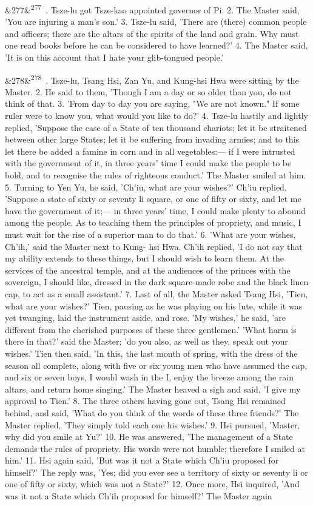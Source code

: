 \documentclass[12pt]{article}
\newcommand{\para}[1][]{\par\noindent\ifx&#1&\else\textsuperscript{\footnotesize #1}~\fi}
\begin{document}
\para[277] 1. Tsze-lu got Tsze-kao appointed governor of Pi. 2. The Master said, 'You are injuring a man's son.' 3. Tsze-lu said, 'There are (there) common people and officers; there are the altars of the spirits of the land and grain. Why must one read books before he can be considered to have learned?' 4. The Master said, 'It is on this account that I hate your glib-tongued people.'

\para[278] 1. Tsze-lu, Tsang Hsi, Zan Yu, and Kung-hsi Hwa were sitting by the Master. 2. He said to them, 'Though I am a day or so older than you, do not think of that. 3. 'From day to day you are saying, "We are not known." If some ruler were to know you, what would you like to do?' 4. Tsze-lu hastily and lightly replied, 'Suppose the case of a State of ten thousand chariots; let it be straitened between other large States; let it be suffering from invading armies; and to this let there be added a famine in corn and in all vegetables:--- if I were intrusted with the government of it, in three years' time I could make the people to be bold, and to recognise the rules of righteous conduct.' The Master smiled at him. 5. Turning to Yen Yu, he said, 'Ch'iu, what are your wishes?' Ch'iu replied, 'Suppose a state of sixty or seventy li square, or one of fifty or sixty, and let me have the government of it;--- in three years' time, I could make plenty to abound among the people. As to teaching them the principles of propriety, and music, I must wait for the rise of a superior man to do that.' 6. 'What are your wishes, Ch'ih,' said the Master next to Kung- hsi Hwa. Ch'ih replied, 'I do not say that my ability extends to these things, but I should wish to learn them. At the services of the ancestral temple, and at the audiences of the princes with the sovereign, I should like, dressed in the dark square-made robe and the black linen cap, to act as a small assistant.' 7. Last of all, the Master asked Tsang Hsi, 'Tien, what are your wishes?' Tien, pausing as he was playing on his lute, while it was yet twanging, laid the instrument aside, and rose. 'My wishes,' he said, 'are different from the cherished purposes of these three gentlemen.' 'What harm is there in that?' said the Master; 'do you also, as well as they, speak out your wishes.' Tien then said, 'In this, the last month of spring, with the dress of the season all complete, along with five or six young men who have assumed the cap, and six or seven boys, I would wash in the I, enjoy the breeze among the rain altars, and return home singing.' The Master heaved a sigh and said, 'I give my approval to Tien.' 8. The three others having gone out, Tsang Hsi remained behind, and said, 'What do you think of the words of these three friends?' The Master replied, 'They simply told each one his wishes.' 9. Hsi pursued, 'Master, why did you smile at Yu?' 10. He was answered, 'The management of a State demands the rules of propriety. His words were not humble; therefore I smiled at him.' 11. Hsi again said, 'But was it not a State which Ch'iu proposed for himself?' The reply was, 'Yes; did you ever see a territory of sixty or seventy li or one of fifty or sixty, which was not a State?' 12. Once more, Hsi inquired, 'And was it not a State which Ch'ih proposed for himself?' The Master again 
\end{document}
